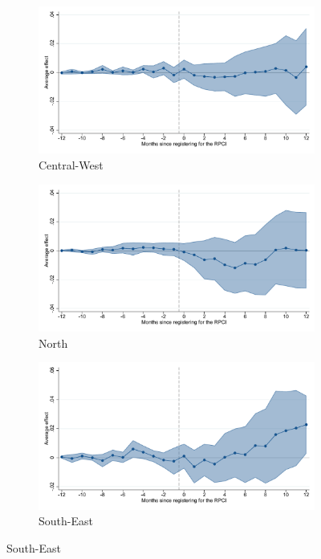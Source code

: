 \begin{figure}[H]
    \begin{subfigure}{0.32\textwidth}
    \caption{Central-West}
    \includegraphics[width=\textwidth]{04_Figures/muestra_10porciento/event_study_alta_reg_centro_occ_dcdh_connected.pdf}
    \end{subfigure}
    \begin{subfigure}{0.32\textwidth}
    \caption{North}
    \includegraphics[width=\textwidth]{04_Figures/muestra_10porciento/event_study_alta_reg_norte_dcdh_connected.pdf}
    \end{subfigure}
    \begin{subfigure}{0.32\textwidth}
    \caption{South-East}
    \includegraphics[width=\textwidth]{04_Figures/muestra_10porciento/event_study_alta_reg_sur_dcdh_connected.pdf}
    \end{subfigure}


\end{figure}

